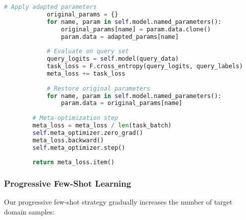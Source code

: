 \documentclass[journal]{IEEEtran}
\begin{document}
\begin{lstlisting}[language=Python, caption=MAML Implementation for Few-Shot Learning]
            # Apply adapted parameters
            original_params = {}
            for name, param in self.model.named_parameters():
                original_params[name] = param.data.clone()
                param.data = adapted_params[name]
            
            # Evaluate on query set
            query_logits = self.model(query_data)
            task_loss = F.cross_entropy(query_logits, query_labels)
            meta_loss += task_loss
            
            # Restore original parameters
            for name, param in self.model.named_parameters():
                param.data = original_params[name]
        
        # Meta-optimization step
        meta_loss = meta_loss / len(task_batch)
        self.meta_optimizer.zero_grad()
        meta_loss.backward()
        self.meta_optimizer.step()
        
        return meta_loss.item()
\end{lstlisting}

\subsubsection{Progressive Few-Shot Learning}

Our progressive few-shot strategy gradually increases the number of target domain samples:
\end{document}
